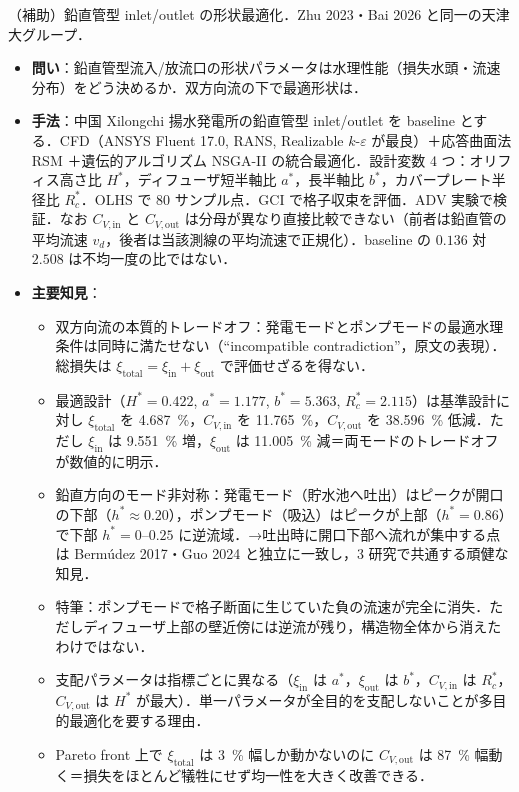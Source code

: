 \documentclass[11pt]{jsarticle}
\newcommand{\litref}[1]{{\large\bfseries\color{citecolor}#1}}
\begin{document}
\noindent\litref{Zhang et al. (2020)}\quad（補助）鉛直管型 inlet/outlet の形状最適化．Zhu 2023・Bai 2026 と同一の天津大グループ．
\begin{itemize}
  \item \textbf{問い}：鉛直管型流入/放流口の形状パラメータは水理性能（損失水頭・流速分布）をどう決めるか．双方向流の下で最適形状は．
  \item \textbf{手法}：中国 Xilongchi 揚水発電所の鉛直管型 inlet/outlet を baseline とする．CFD（ANSYS Fluent 17.0, RANS, Realizable $k$-$\varepsilon$ が最良）＋応答曲面法 RSM ＋遺伝的アルゴリズム NSGA-II の統合最適化．設計変数 4 つ：オリフィス高さ比 $H^*$，ディフューザ短半軸比 $a^*$，長半軸比 $b^*$，カバープレート半径比 $R_c^*$．OLHS で 80 サンプル点．GCI で格子収束を評価．ADV 実験で検証．なお $C_{V,\mathrm{in}}$ と $C_{V,\mathrm{out}}$ は分母が異なり直接比較できない（前者は鉛直管の平均流速 $v_d$，後者は当該測線の平均流速で正規化）．baseline の $0.136$ 対 $2.508$ は不均一度の比ではない．
  \item \textbf{主要知見}：
  \begin{itemize}
    \item 双方向流の本質的トレードオフ：発電モードとポンプモードの最適水理条件は同時に満たせない（``incompatible contradiction''，原文の表現）．総損失は $\xi_\mathrm{total} = \xi_\mathrm{in} + \xi_\mathrm{out}$ で評価せざるを得ない．
    \item 最適設計（$H^* = 0.422$, $a^* = 1.177$, $b^* = 5.363$, $R_c^* = 2.115$）は基準設計に対し $\xi_\mathrm{total}$ を 4.687~\%，$C_{V,\mathrm{in}}$ を 11.765~\%，$C_{V,\mathrm{out}}$ を 38.596~\% 低減．ただし $\xi_\mathrm{in}$ は 9.551~\% 増，$\xi_\mathrm{out}$ は 11.005~\% 減＝両モードのトレードオフが数値的に明示．
    \item 鉛直方向のモード非対称：発電モード（貯水池へ吐出）はピークが開口の下部（$h^* \approx 0.20$），ポンプモード（吸込）はピークが上部（$h^* = 0.86$）で下部 $h^* = 0$--$0.25$ に逆流域．→吐出時に開口下部へ流れが集中する点は Berm\'udez 2017・Guo 2024 と独立に一致し，3 研究で共通する頑健な知見．
    \item 特筆：ポンプモードで格子断面に生じていた負の流速が完全に消失．ただしディフューザ上部の壁近傍には逆流が残り，構造物全体から消えたわけではない．
    \item 支配パラメータは指標ごとに異なる（$\xi_\mathrm{in}$ は $a^*$，$\xi_\mathrm{out}$ は $b^*$，$C_{V,\mathrm{in}}$ は $R_c^*$，$C_{V,\mathrm{out}}$ は $H^*$ が最大）．単一パラメータが全目的を支配しないことが多目的最適化を要する理由．
    \item Pareto front 上で $\xi_\mathrm{total}$ は 3~\% 幅しか動かないのに $C_{V,\mathrm{out}}$ は 87~\% 幅動く＝損失をほとんど犠牲にせず均一性を大きく改善できる．

\end{itemize}
\end{itemize}
\end{document}
